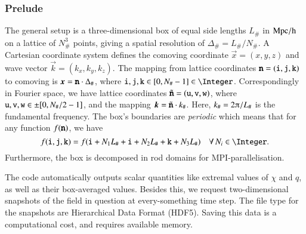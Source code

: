 







\subsubsection{Prelude}

The general setup is a three-dimensional box of equal side lengths $L_\#$ in $\mathrm{Mpc/h}$ on a lattice of $N_\#^3$ points, giving a spatial resolution of $\Delta_\#=L_\#/N_\#$. %
A Cartesian coordinate system defines the comoving coordinate $\vec{x}=(x,y,z)$ and wave vector $\vec{k}=(k_x, k_y, k_z)$. The mapping from lattice coordinates $\boldsymbol{\mathtt{n}}= (\mathtt{i}, \mathtt{j}, \mathtt{k})$ to comoving is $\boldsymbol{x}=\boldsymbol{\mathtt{n}}\cdot  \Delta_\#$, where $\lcoord{i},\lcoord{j}, \lcoord{k}\in [0, N_\#-1]\in \Integer$. 
Correspondingly in Fourier space, we have lattice coordinates $\tilde{\boldsymbol{\mathtt{n}}} =(\mathtt{u}, \mathtt{v}, \mathtt{w})$, where $\mathtt{u}, \mathtt{v}, \mathtt{w} \in\pm[0, N_\#/2-1]$, and the mapping $\boldsymbol{k} =\tilde{\boldsymbol{\mathtt{n}}} \cdot k_\# $. Here,  $k_\#=2\ppi/L_\#$ is the fundamental frequency. 
The box's boundaries are \emph{periodic} which means that for any function $f(\boldsymbol{\mathtt{n}})$, we have
\begin{equation}\label{eq:PT:code:periodic_boundaries}
    f(\lcoord{i}, \lcoord{j}, \lcoord{k}) = f(\lcoord{i}+N_1 L_\# +\lcoord{i}+N_2 L_\#  + \lcoord{k}+N_3 L_\# ) \quad\forall \,  N_i \in \Integer.
\end{equation}
Furthermore, the box is decomposed in rod domains for MPI-parallelisation.


The code automatically outputs scalar quantities like extremal values of $\chi$ and $q$, as well as their box-averaged values. Besides this, we request two-dimensional snapshots of the field in question at every-something time step. The file type for the snapshots are Hierarchical Data Format (HDF5). Saving this data is a computational cost, and requires available memory. %


